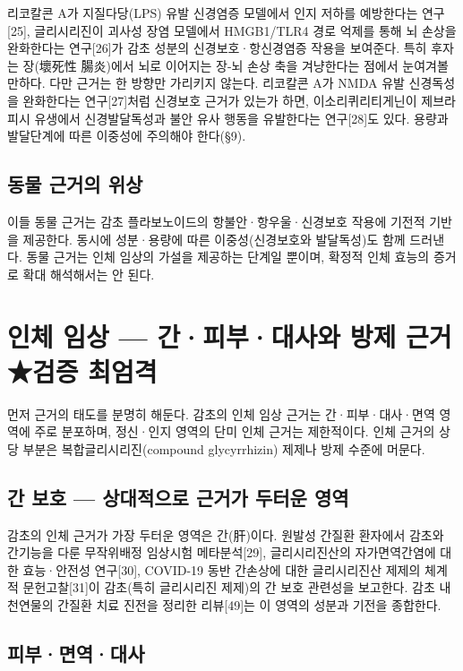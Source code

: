 \documentclass[12pt,oneside]{book}
\begin{document}
리코칼콘 A가 지질다당(LPS) 유발 신경염증 모델에서 인지 저하를 예방한다는 연구[25], 글리시리진이 괴사성 장염 모델에서 HMGB1/TLR4 경로 억제를 통해 뇌 손상을 완화한다는 연구[26]가 감초 성분의 신경보호·항신경염증 작용을 보여준다. 특히 후자는 장(壞死性 腸炎)에서 뇌로 이어지는 장-뇌 손상 축을 겨냥한다는 점에서 눈여겨볼 만하다. 다만 근거는 한 방향만 가리키지 않는다. 리코칼콘 A가 NMDA 유발 신경독성을 완화한다는 연구[27]처럼 신경보호 근거가 있는가 하면, 이소리퀴리티게닌이 제브라피시 유생에서 신경발달독성과 불안 유사 행동을 유발한다는 연구[28]도 있다. 용량과 발달단계에 따른 이중성에 주의해야 한다(§9).

\subsection{동물 근거의 위상}

이들 동물 근거는 감초 플라보노이드의 항불안·항우울·신경보호 작용에 기전적 기반을 제공한다. 동시에 성분·용량에 따른 이중성(신경보호와 발달독성)도 함께 드러낸다. 동물 근거는 인체 임상의 가설을 제공하는 단계일 뿐이며, 확정적 인체 효능의 증거로 확대 해석해서는 안 된다.

\section{인체 임상 — 간·피부·대사와 방제 근거 ★검증 최엄격}

먼저 근거의 태도를 분명히 해둔다. 감초의 인체 임상 근거는 간·피부·대사·면역 영역에 주로 분포하며, 정신·인지 영역의 단미 인체 근거는 제한적이다. 인체 근거의 상당 부분은 복합글리시리진(compound glycyrrhizin) 제제나 방제 수준에 머문다.

\subsection{간 보호 — 상대적으로 근거가 두터운 영역}

감초의 인체 근거가 가장 두터운 영역은 간(肝)이다. 원발성 간질환 환자에서 감초와 간기능을 다룬 무작위배정 임상시험 메타분석[29], 글리시리진산의 자가면역간염에 대한 효능·안전성 연구[30], COVID-19 동반 간손상에 대한 글리시리진산 제제의 체계적 문헌고찰[31]이 감초(특히 글리시리진 제제)의 간 보호 관련성을 보고한다. 감초 내 천연물의 간질환 치료 진전을 정리한 리뷰[49]는 이 영역의 성분과 기전을 종합한다.

\subsection{피부·면역·대사}
\end{document}
